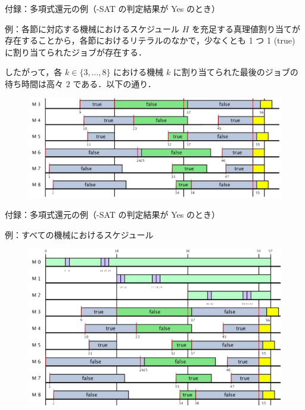 \documentclass[dvipdfmx]{beamer}
\begin{document}
    \begin{frame}{付録：多項式還元の例（{-SAT} の判定結果が Yes のとき）}
      \begin{exampleblock}{例：各節に対応する機械におけるスケジュール}
        $H$ を充足する真理値割り当てが存在することから，各節におけるリテラルのなかで，少なくとも 1 つ 1 (true) に割り当てられたジョブが存在する．

        したがって，各 $k \in \{3,\ldots,8\}$ における機械 $k$ に割り当てられた最後のジョブの待ち時間は高々 $2$ である．以下の通り．
        \begin{figure}[h]
          \centering
          \includegraphics[width = 12cm]{figure/reductionExample2.pdf}
        \end{figure}
      \end{exampleblock}
    \end{frame}

    \begin{frame}{付録：多項式還元の例（{-SAT} の判定結果が Yes のとき）}
      \begin{exampleblock}{例：すべての機械におけるスケジュール}
        \begin{figure}[h]
          \centering
          \includegraphics[width = 12cm]{figure/reductionExample3.pdf}
        \end{figure}
      \end{exampleblock}
    \end{frame}
\end{document}
